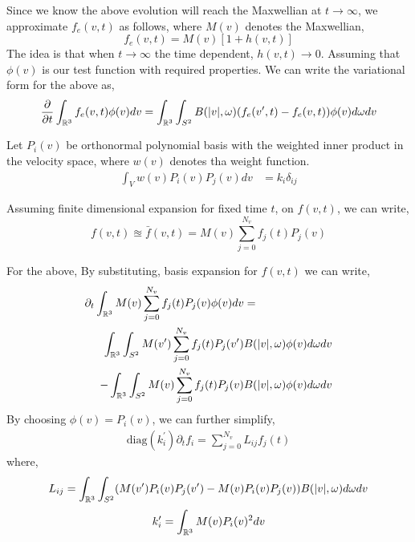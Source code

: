 \documentclass{article}
\begin{document}
Since we know the above evolution will reach the Maxwellian at $t\rightarrow \infty$, we approximate $f_e(v,t)$ as follows, where $M(v)$ denotes the Maxwellian, 
\begin{equation}
    f_e(v,t) = M(v)[1 + h(v,t)] \label{eq:maxwelian}
\end{equation}
The idea is that when $t\rightarrow \infty$ the time dependent, $h(v,t)\rightarrow 0$.
Assuming that $\phi(v)$ is our test function with required properties. We can write the variational form for the above as, 
\begin{equation}
    \frac{\partial}{\partial t} \int_{\mathbb{R}^3} f_e(v,t) \phi(v) dv = \int_{\mathbb{R}^3} \int_{S^2} B(|v|,\omega)(f_e(v^\prime,t) - f_e(v,t)) \phi(v) d\omega dv \label{eq:0d_wf}
\end{equation}

Let $P_i(v)$ be orthonormal polynomial basis with the weighted inner product in the velocity space, where $w(v)$ denotes tha weight function. 
\begin{align}
    \int_{V} w(v)P_i(v)P_j(v) dv &= k_i\delta_{ij}
\end{align}

Assuming finite dimensional expansion for fixed time $t$, on $f(v,t)$, we can write, 
\begin{equation}
    f(v,t) \approxeq \bar{f}(v,t) = M(v)\sum_{j=0}^{N_v} f_j(t) P_j(v) \label{eq:basis_expansion}
\end{equation}

For the above, By substituting, basis expansion for $f(v,t)$ we can write, 
\begin{align}
    \partial_t \int_{\mathbb{R}^3} M(v)\sum_{j=0}^{N_v} f_j(t) P_j(v) \phi(v) dv &= \\\int_{\mathbb{R}^3} \int_{S^2} M(v^\prime)\sum_{j=0}^{N_v} f_j(t) P_j(v^\prime) & B(|v|,\omega) \phi(v) d\omega dv \nonumber \\
    -\int_{\mathbb{R}^3} \int_{S^2} M(v)\sum_{j=0}^{N_v} f_j(t) P_j(v) &B(|v|,\omega) \phi(v) d\omega dv
\end{align}
By choosing $\phi(v) = P_i(v)$, we can further simplify, 
\begin{align}
    \text{diag}(k_i^\prime)\partial_t{f_i} = \sum_{j=0}^{N_v} L_{ij} f_j(t)
\end{align} where, 
\begin{equation}
    L_{ij} = \int_{\mathbb{R}^3} \int_{S^2} (M(v^\prime) P_i(v)P_j(v^\prime)  - M(v) P_i(v) P_j(v) )  B(|v|,\omega) d\omega dv
\end{equation}
\begin{equation}
    k_{i}^\prime = \int_{\mathbb{R}^3} M(v) P_i(v)^2 dv
\end{equation}
\end{document}
